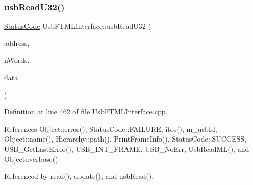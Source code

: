 \subsubsection{\texorpdfstring{usb\+Read\+U32()}{usbReadU32()}}
{\footnotesize\ttfamily \hyperlink{classStatusCode}{Status\+Code} Usb\+F\+T\+M\+L\+Interface\+::usb\+Read\+U32 (\begin{DoxyParamCaption}\item[{unsigned long int}]{address,  }\item[{unsigned long int}]{n\+Words,  }\item[{unsigned long $\ast$}]{data }\end{DoxyParamCaption})}



Definition at line 462 of file Usb\+F\+T\+M\+L\+Interface.\+cpp.



References Object\+::error(), Status\+Code\+::\+F\+A\+I\+L\+U\+RE, itos(), m\+\_\+usb\+Id, Object\+::name(), Hierarchy\+::path(), Print\+Frame\+Info(), Status\+Code\+::\+S\+U\+C\+C\+E\+SS, U\+S\+B\+\_\+\+Get\+Last\+Error(), U\+S\+B\+\_\+\+I\+N\+T\+\_\+\+F\+R\+A\+ME, U\+S\+B\+\_\+\+No\+Err, Usb\+Read\+M\+L(), and Object\+::verbose().



Referenced by read(), update(), and usb\+Read().


